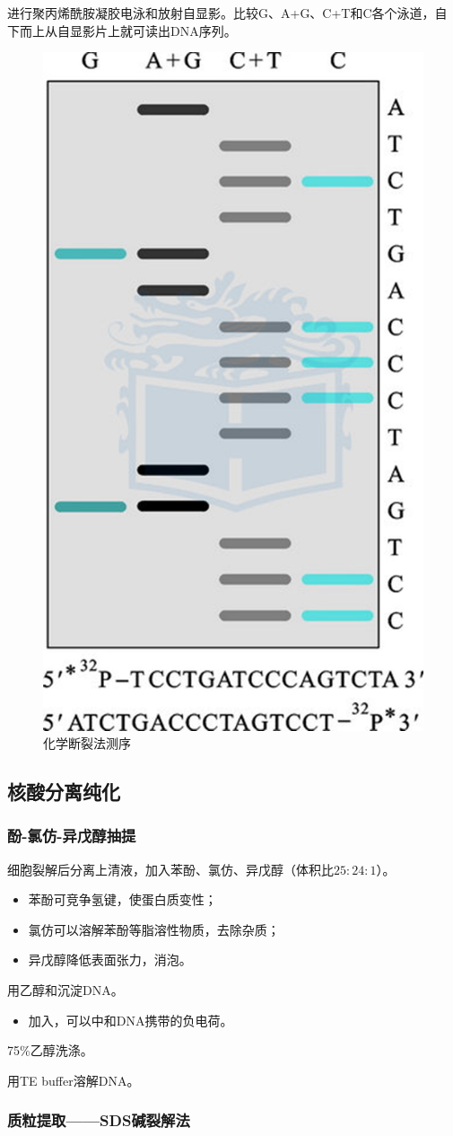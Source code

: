 进行聚丙烯酰胺凝胶电泳和放射自显影。比较G、A+G、C+T和C各个泳道，自下而上从自显影片上就可读出DNA序列。

\begin{figure}[htbp]
	\centering
	\includegraphics[width=0.3\linewidth]{Pics/化学断裂法测序}
	\caption{化学断裂法测序}
	\label{fig:MG_sequencing}
\end{figure}


\subsection{核酸分离纯化}

\subsubsection{酚-氯仿-异戊醇抽提}

细胞裂解后分离上清液，加入苯酚、氯仿、异戊醇（体积比$25:24:1$）。
\begin{itemize}
	\item 苯酚可竞争氢键，使蛋白质变性；
	\item 氯仿可以溶解苯酚等脂溶性物质，去除杂质；
	\item 异戊醇降低表面张力，消泡。
\end{itemize}

用乙醇和沉淀DNA。
\begin{itemize}
	\item 加入，可以中和DNA携带的负电荷。
\end{itemize}

75\%乙醇洗涤。

用TE buffer溶解DNA。

\subsubsection{质粒提取——SDS碱裂解法}

